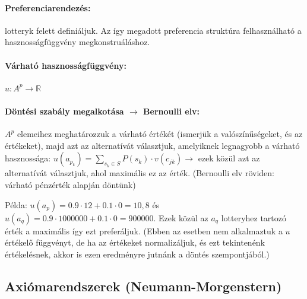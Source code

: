 \documentclass[a4paper,12pt]{article}
\begin{document}

\paragraph{Preferenciarendezés: } lotteryk felett definiáljuk. Az így megadott preferencia struktúra felhasználható a hasznosságfüggvény megkonstruáláshoz. %

\paragraph{Várható hasznosságfüggvény:}  $u: A^p \rightarrow \mathbb{R}$  %


\paragraph{Döntési szabály megalkotása  $\rightarrow$ Bernoulli elv: } $A^p$ elemeihez meghatározzuk a várható értékét (ismerjük a valószínűségeket, és az értékeket), majd azt az alternatívát választjuk, amelyiknek legnagyobb a várható hasznossága: $u(a_{p_k})= \sum_{s_k \in S} P(s_k)\cdot v(c_{jk}) \rightarrow$ ezek közül azt az alternatívát választjuk, ahol maximális ez az érték. (Bernoulli elv röviden: várható pénzérték alapján döntünk)


Példa: $u(a_p)= 0.9\cdot 12 + 0.1\cdot 0 = 10,8$ és $u(a_q)= 0.9\cdot 1000000 + 0.1\cdot 0 = 900000$. Ezek közül az $a_q$ lotteryhez tartozó érték a maximális így ezt preferáljuk. (Ebben az esetben nem alkalmaztuk a $u$ értékelő függvényt, de ha az értékeket normalizáljuk, és ezt tekintenénk értékelésnek, akkor is ezen eredményre jutnánk a döntés szempontjából.)

\subsection{Axiómarendszerek (Neumann-Morgenstern)} 
\end{document}
